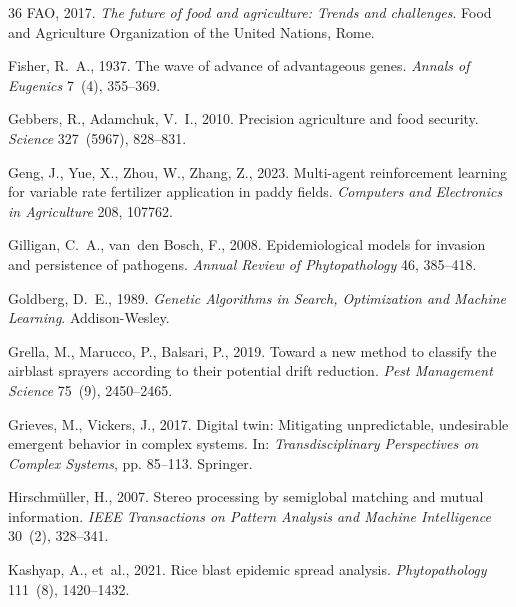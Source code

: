 \documentclass[review,3p,times,authoryear]{elsarticle}
\begin{document}
\begin{thebibliography}{36}
FAO, 2017.
\newblock \emph{The future of food and agriculture: Trends and challenges}.
\newblock Food and Agriculture Organization of the United Nations, Rome.

Fisher, R.~A., 1937.
\newblock The wave of advance of advantageous genes.
\newblock \emph{Annals of Eugenics} 7~(4), 355--369.

Gebbers, R., Adamchuk, V.~I., 2010.
\newblock Precision agriculture and food security.
\newblock \emph{Science} 327~(5967), 828--831.

Geng, J., Yue, X., Zhou, W., Zhang, Z., 2023.
\newblock Multi-agent reinforcement learning for variable rate fertilizer application in paddy fields.
\newblock \emph{Computers and Electronics in Agriculture} 208, 107762.

Gilligan, C.~A., van~den Bosch, F., 2008.
\newblock Epidemiological models for invasion and persistence of pathogens.
\newblock \emph{Annual Review of Phytopathology} 46, 385--418.

Goldberg, D.~E., 1989.
\newblock \emph{Genetic Algorithms in Search, Optimization and Machine Learning}.
\newblock Addison-Wesley.

Grella, M., Marucco, P., Balsari, P., 2019.
\newblock Toward a new method to classify the airblast sprayers according to their potential drift reduction.
\newblock \emph{Pest Management Science} 75~(9), 2450--2465.

Grieves, M., Vickers, J., 2017.
\newblock Digital twin: Mitigating unpredictable, undesirable emergent behavior in complex systems.
\newblock In: \emph{Transdisciplinary Perspectives on Complex Systems}, pp. 85--113. Springer.

Hirschm{\"u}ller, H., 2007.
\newblock Stereo processing by semiglobal matching and mutual information.
\newblock \emph{IEEE Transactions on Pattern Analysis and Machine Intelligence} 30~(2), 328--341.

Kashyap, A., et~al., 2021.
\newblock Rice blast epidemic spread analysis.
\newblock \emph{Phytopathology} 111~(8), 1420--1432.


\end{thebibliography}
\end{document}
